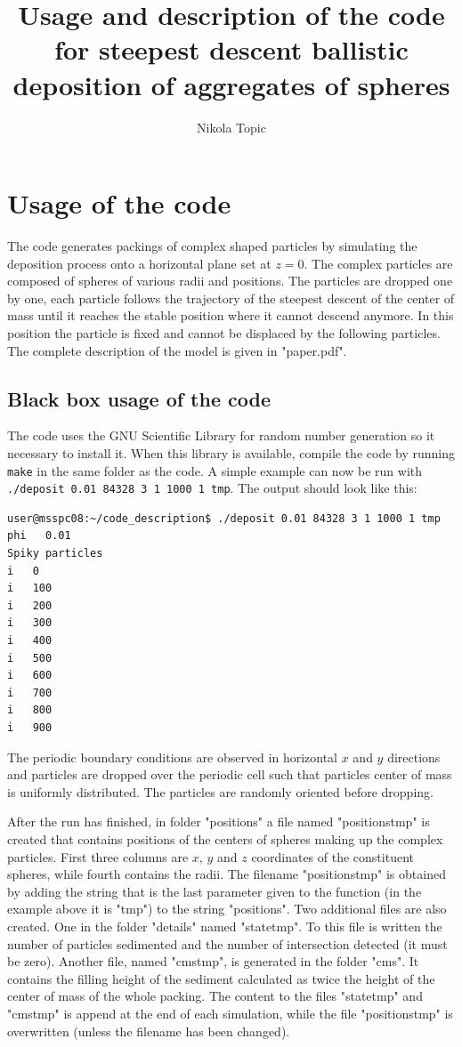 \documentclass[12pt]{article}
\begin{document}
\title{Usage and description of the code for steepest descent ballistic deposition of aggregates of spheres}
\author{Nikola Topic}
\maketitle
\tableofcontents
\section{Usage of the code}
The code generates packings of complex shaped particles by simulating the deposition process onto a horizontal plane set at $z=0$. The complex particles are composed of spheres of various radii and positions. The particles are dropped one by one, each particle follows the trajectory of the steepest descent of the center of mass until it reaches the stable position where it cannot descend anymore. In this position the particle is fixed and cannot be displaced by the following particles. The complete description of the model is given in "paper.pdf".
\subsection{Black box usage of the code}
The code uses the GNU Scientific Library for random number generation so it necessary to install it. When this library is available, compile the code by running \texttt{make} in the same folder as the code. A simple example can now be run with \texttt{./deposit 0.01 84328 3 1 1000 1 tmp}. The output should look like this:

\begin{verbatim}
user@msspc08:~/code_description$ ./deposit 0.01 84328 3 1 1000 1 tmp 
phi   0.01
Spiky particles
i   0
i   100
i   200
i   300
i   400
i   500
i   600
i   700
i   800
i   900
\end{verbatim}

The periodic boundary conditions are observed in horizontal $x$ and $y$ directions and particles are dropped over the periodic cell such that particles center of mass is uniformly distributed. The particles are randomly oriented before dropping.

After the run has finished, in folder "positions" a file named "positionstmp" is created that contains positions of the centers of spheres making up the complex particles. First three columns are $x$, $y$ and $z$ coordinates of the constituent spheres, while fourth contains the radii.  The filename "positionstmp" is obtained by adding the string that is the last parameter given to the function (in the example above it is "tmp") to the string "positions". Two additional files are also created. One in the folder "details" named "statetmp". To this file is written the number of particles sedimented and the number of intersection detected (it must be zero). Another file, named "cmstmp", is generated in the folder "cms". It contains the filling height of the sediment calculated as twice the height of the center of mass of the whole packing. The content to the files "statetmp" and "cmstmp" is append at the end of each simulation, while the file "positionstmp" is overwritten (unless the filename has been changed).
\end{document}
